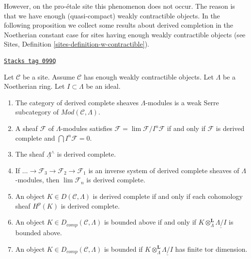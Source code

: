\medskip\noindent
However, on the pro-\'etale site this phenomenon does not occur.
The reason is that we have enough (quasi-compact) weakly contractible objects.
In the following proposition we collect some results about derived
completion in the Noetherian constant case for sites having enough
weakly contractible objects (see
Sites, Definition \ref{sites-definition-w-contractible}).

\begin{proposition}
\label{proetale-proposition-enough-weakly-contractibles}
\href{https://stacks.math.columbia.edu/tag/099Q}{\texttt{Stacks tag 099Q}}

Let $\mathcal{C}$ be a site. Assume $\mathcal{C}$ has enough
weakly contractible objects.
Let $\Lambda$ be a Noetherian ring. Let $I \subset \Lambda$ be an ideal.
\begin{enumerate}
\item The category of derived complete sheaves $\Lambda$-modules is a
weak Serre subcategory of $\textit{Mod}(\mathcal{C}, \Lambda)$.
\item A sheaf $\mathcal{F}$ of $\Lambda$-modules satisfies
$\mathcal{F} = \lim \mathcal{F}/I^n\mathcal{F}$ if and only if
$\mathcal{F}$ is derived complete and $\bigcap I^n\mathcal{F} = 0$.
\item The sheaf $\underline{\Lambda}^\wedge$ is derived complete.
\item If $\ldots \to \mathcal{F}_3 \to \mathcal{F}_2 \to \mathcal{F}_1$
is an inverse system of derived complete sheaves of $\Lambda$-modules,
then $\lim \mathcal{F}_n$ is derived complete.
\item An object $K \in D(\mathcal{C}, \Lambda)$ is derived complete if
and only if each cohomology sheaf $H^p(K)$ is derived complete.
\item An object $K \in D_{comp}(\mathcal{C}, \Lambda)$ is bounded above
if and only if $K \otimes_\Lambda^\mathbf{L} \underline{\Lambda/I}$
is bounded above.
\item An object $K \in D_{comp}(\mathcal{C}, \Lambda)$ is bounded
if $K \otimes_\Lambda^\mathbf{L} \underline{\Lambda/I}$ has finite
tor dimension.
\end{enumerate}
\end{proposition}

